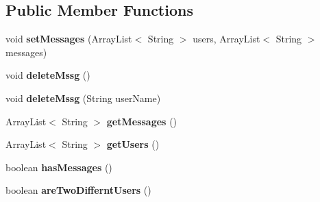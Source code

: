 \subsection*{Public Member Functions}
\begin{DoxyCompactItemize}
\item 
void {\bfseries set\+Messages} (Array\+List$<$ String $>$ users, Array\+List$<$ String $>$ messages)\hypertarget{classcom_1_1example_1_1sebastian_1_1tindertp_1_1commonTools_1_1DataThroughActivities_a1aafa7439bada6ac8f188db070a46f33}{}\label{classcom_1_1example_1_1sebastian_1_1tindertp_1_1commonTools_1_1DataThroughActivities_a1aafa7439bada6ac8f188db070a46f33}

\item 
void {\bfseries delete\+Mssg} ()\hypertarget{classcom_1_1example_1_1sebastian_1_1tindertp_1_1commonTools_1_1DataThroughActivities_ab0746d6008ca77bf6a2615263a39bcfe}{}\label{classcom_1_1example_1_1sebastian_1_1tindertp_1_1commonTools_1_1DataThroughActivities_ab0746d6008ca77bf6a2615263a39bcfe}

\item 
void {\bfseries delete\+Mssg} (String user\+Name)\hypertarget{classcom_1_1example_1_1sebastian_1_1tindertp_1_1commonTools_1_1DataThroughActivities_a87abc28d0d05f4ec5c20861dd1bcd900}{}\label{classcom_1_1example_1_1sebastian_1_1tindertp_1_1commonTools_1_1DataThroughActivities_a87abc28d0d05f4ec5c20861dd1bcd900}

\item 
Array\+List$<$ String $>$ {\bfseries get\+Messages} ()\hypertarget{classcom_1_1example_1_1sebastian_1_1tindertp_1_1commonTools_1_1DataThroughActivities_a65f039291214ccbc8bd00f25e99ee055}{}\label{classcom_1_1example_1_1sebastian_1_1tindertp_1_1commonTools_1_1DataThroughActivities_a65f039291214ccbc8bd00f25e99ee055}

\item 
Array\+List$<$ String $>$ {\bfseries get\+Users} ()\hypertarget{classcom_1_1example_1_1sebastian_1_1tindertp_1_1commonTools_1_1DataThroughActivities_a788fb5e5f439ec4e55c591a2dac0f7e4}{}\label{classcom_1_1example_1_1sebastian_1_1tindertp_1_1commonTools_1_1DataThroughActivities_a788fb5e5f439ec4e55c591a2dac0f7e4}

\item 
boolean {\bfseries has\+Messages} ()\hypertarget{classcom_1_1example_1_1sebastian_1_1tindertp_1_1commonTools_1_1DataThroughActivities_a06994d99593618b6fdc225a64e188b1c}{}\label{classcom_1_1example_1_1sebastian_1_1tindertp_1_1commonTools_1_1DataThroughActivities_a06994d99593618b6fdc225a64e188b1c}

\item 
boolean {\bfseries are\+Two\+Differnt\+Users} ()\hypertarget{classcom_1_1example_1_1sebastian_1_1tindertp_1_1commonTools_1_1DataThroughActivities_ac792827825bb7130b28495a068249376}{}\label{classcom_1_1example_1_1sebastian_1_1tindertp_1_1commonTools_1_1DataThroughActivities_ac792827825bb7130b28495a068249376}

\end{DoxyCompactItemize}
